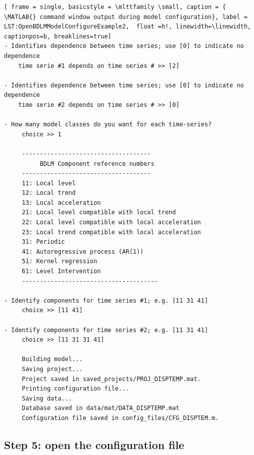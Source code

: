  \begin{lstlisting}[ frame = single, basicstyle = \mlttfamily \small, caption = { \MATLAB{} command window output during model configuration}, label = LST:OpenBDLMModelConfigureExample2,  float =h!, linewidth=\linewidth, captionpos=b, breaklines=true]
- Identifies dependence between time series; use [0] to indicate no dependence
    time serie #1 depends on time series # >> [2]

- Identifies dependence between time series; use [0] to indicate no dependence
    time serie #2 depends on time series # >> [0]

- How many model classes do you want for each time-series? 
     choice >> 1
     
     ------------------------------------
          BDLM Component reference numbers
     ------------------------------------
     11: Local level 
     12: Local trend 
     13: Local acceleration 
     21: Local level compatible with local trend 
     22: Local level compatible with local acceleration 
     23: Local trend compatible with local acceleration 
     31: Periodic 
     41: Autoregressive process (AR(1)) 
     51: Kernel regression 
     61: Level Intervention 
     --------------------------------------

- Identify components for time series #1; e.g. [11 31 41]
     choice >> [11 41]

- Identify components for time series #2; e.g. [11 31 41]
     choice >> [11 31 31 41]

     Building model...
     Saving project...
     Project saved in saved_projects/PROJ_DISPTEMP.mat. 
     Printing configuration file...
     Saving data...
     Database saved in data/mat/DATA_DISPTEMP.mat 
     Configuration file saved in config_files/CFG_DISPTEM.m. 
\end{lstlisting}


\subsection{Step 5: open the configuration file}

